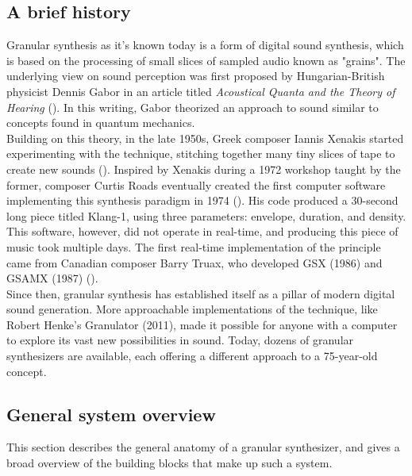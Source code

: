 \documentclass[10pt, twocolumn]{IEEEtran}
\begin{document}
\subsection{A brief history}
Granular synthesis as it's known today is a form of digital sound synthesis, which is based on the processing of small slices of sampled audio known as "grains". The underlying view on sound perception was first proposed by Hungarian-British physicist Dennis Gabor in an article titled \textit{Acoustical Quanta and the Theory of Hearing} (\cite{gabor47}). In this writing, Gabor theorized an approach to sound similar to concepts found in quantum mechanics.\\ Building on this theory, in the late 1950s, Greek composer Iannis Xenakis started experimenting with the technique, stitching together many tiny slices of tape to create new sounds (\cite{robindore96}). Inspired by Xenakis during a 1972 workshop taught by the former, composer Curtis Roads eventually created the first computer software implementing this synthesis paradigm in 1974 (\cite{opie03}). His code produced a 30-second long piece titled Klang-1, using three parameters: envelope, duration, and density. This software, however, did not operate in real-time, and producing this piece of music took multiple days. The first real-time implementation of the principle came from Canadian composer Barry Truax, who developed GSX (1986) and GSAMX (1987) (\cite{truax88}). \\
Since then, granular synthesis has established itself as a pillar of modern digital sound generation. More approachable implementations of the technique, like Robert Henke's Granulator (2011), made it possible for anyone with a computer to explore its vast new possibilities in sound. Today, dozens of granular synthesizers are available, each offering a different approach to a 75-year-old concept.

\subsection{General system overview}
This section describes the general anatomy of a granular synthesizer, and gives a broad overview of the building blocks that make up such a system. 
\end{document}
